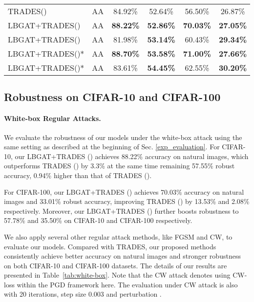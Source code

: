 \documentclass[final]{cvpr}
\begin{document}
\begin{table*}[t!]
\begin{tabular}{l|c|c | c | c |c }
		TRADES()                       &AA &84.92\% &52.64\% &56.50\% &26.87\% \\
		LBGAT+TRADES()                 &AA &\textbf{88.22\%} &\textbf{52.86\%} &\textbf{70.03\%} &\textbf{27.05\%} \\
		LBGAT+TRADES()                 &AA &81.98\% &\textbf{53.14\%} &60.43\% &\textbf{29.34\%} \\
		\hline
		LBGAT+TRADES()*                &AA &\textbf{88.70\%} &\textbf{53.58\%} &\textbf{71.00\%} &\textbf{27.66\%} \\
		LBGAT+TRADES()*                &AA &83.61\% &\textbf{54.45\%} &62.55\% &\textbf{30.20\%} \\
		\hline
		\hline
	\end{tabular}
	\label{tab:white-box}
\end{table*}

\subsection{Robustness on CIFAR-10 and CIFAR-100}
\label{sec:4.1}
\paragraph{White-box Regular Attacks.}
We evaluate the robustness of our models under the white-box attack using the same setting as described at the beginning of Sec. \ref{exp_evaluation}. 
For CIFAR-10, our LBGAT+TRADES () achieves 88.22\% accuracy on natural images, which outperforms TRADES () by 3.3\% at the same time remaining 57.55\% robust accuracy, 0.94\% higher than that of TRADES (). 

For CIFAR-100, our LBGAT+TRADES () achieves 70.03\% accuracy on natural images and 33.01\% robust accuracy, improving TRADES () by 13.53\% and 2.08\% respectively. 
Moreover, our LBGAT+TRADES () further boosts robustness to 57.78\% and 35.50\% on CIFAR-10 and CIFAR-100 respectively. 

We also apply several other regular attack methods, like FGSM and CW, to evaluate our models. Compared with TRADES, our proposed methods consistently achieve better accuracy on natural images and stronger robustness on both CIFAR-10 and CIFAR-100 datasets. The details of our results are presented in Table~\ref{tab:white-box}. Note that the CW attack denotes using CW-loss within the PGD framework here. The evaluation under CW attack is also with 20 iterations, step size 0.003 and perturbation . 
\end{document}
